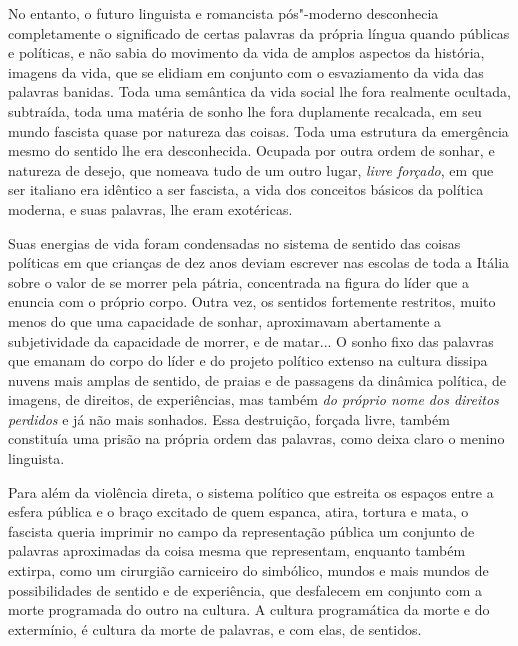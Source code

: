 No entanto, o futuro linguista e romancista pós"-moderno desconhecia
completamente o significado de certas palavras da própria língua quando
públicas e políticas, e não sabia do movimento da vida de amplos
aspectos da história, imagens da vida, que se elidiam em conjunto com o
esvaziamento da vida das palavras banidas. Toda uma semântica da vida
social lhe fora realmente ocultada, subtraída, toda uma matéria de sonho
lhe fora duplamente recalcada, em seu mundo fascista quase por natureza
das coisas. Toda uma estrutura da emergência mesmo do sentido lhe era
desconhecida. Ocupada por outra ordem de sonhar, e natureza de desejo,
que nomeava tudo de um outro lugar, \emph{livre forçado}, em que ser
italiano era idêntico a ser fascista, a vida dos conceitos básicos da
política moderna, e suas palavras, lhe eram exotéricas.

Suas energias de vida foram condensadas no sistema de sentido das coisas
políticas em que crianças de dez anos deviam escrever nas escolas de
toda a Itália sobre o valor de se morrer pela pátria, concentrada na
figura do líder que a enuncia com o próprio corpo. Outra vez, os
sentidos fortemente restritos, muito menos do que uma capacidade de
sonhar, aproximavam abertamente a subjetividade da capacidade de morrer,
e de matar... O sonho fixo das palavras que emanam do corpo do líder e
do projeto político extenso na cultura dissipa nuvens mais amplas de
sentido, de praias e de passagens da dinâmica política, de imagens, de
direitos, de experiências, mas também \emph{do próprio nome dos direitos
perdidos} e já não mais sonhados. Essa destruição, forçada livre, também
constituía uma prisão na própria ordem das palavras, como deixa claro o
menino linguista.

Para além da violência direta, o sistema político que estreita os
espaços entre a esfera pública e o braço excitado de quem espanca,
atira, tortura e mata, o fascista queria imprimir no campo da
representação pública um conjunto de palavras aproximadas da coisa mesma
que representam, enquanto também extirpa, como um cirurgião carniceiro
do simbólico, mundos e mais mundos de possibilidades de sentido e de
experiência, que desfalecem em conjunto com a morte programada do outro
na cultura. A cultura programática da morte e do extermínio, é cultura
da morte de palavras, e com elas, de sentidos.

